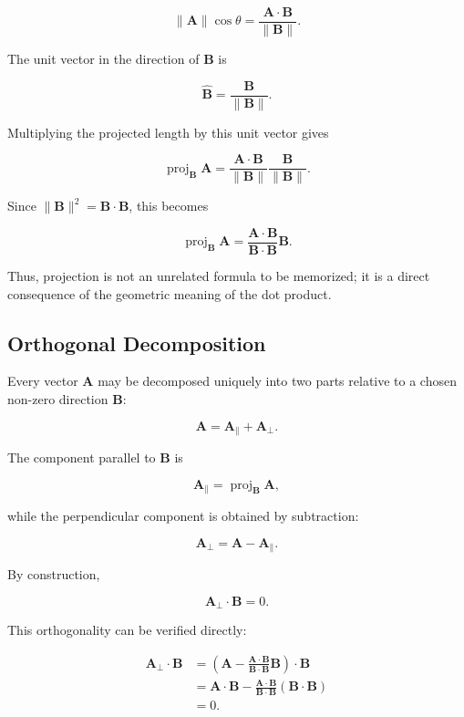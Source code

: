 \[
\lVert\mathbf A\rVert\cos\theta
=
\frac{\mathbf A\cdot\mathbf B}{\lVert\mathbf B\rVert}.
\]

The unit vector in the direction of $\mathbf B$ is

\[
\widehat{\mathbf B}
=
\frac{\mathbf B}{\lVert\mathbf B\rVert}.
\]

Multiplying the projected length by this unit vector gives

\[
\operatorname{proj}_{\mathbf B}\mathbf A
=
\frac{\mathbf A\cdot\mathbf B}{\lVert\mathbf B\rVert}
\frac{\mathbf B}{\lVert\mathbf B\rVert}.
\]

Since $\lVert\mathbf B\rVert^2=\mathbf B\cdot\mathbf B$, this becomes

\[
\boxed{
\operatorname{proj}_{\mathbf B}\mathbf A
=
\frac{\mathbf A\cdot\mathbf B}{\mathbf B\cdot\mathbf B}\mathbf B.
}
\]

Thus, projection is not an unrelated formula to be memorized; it is a direct
consequence of the geometric meaning of the dot product.

\subsection{Orthogonal Decomposition}

Every vector $\mathbf A$ may be decomposed uniquely into two parts relative to
a chosen non-zero direction $\mathbf B$:

\[
\boxed{
\mathbf A=\mathbf A_{\parallel}+\mathbf A_{\perp}.
}
\]

The component parallel to $\mathbf B$ is

\[
\boxed{
\mathbf A_{\parallel}
=
\operatorname{proj}_{\mathbf B}\mathbf A,
}
\]

while the perpendicular component is obtained by subtraction:

\[
\boxed{
\mathbf A_{\perp}
=
\mathbf A-\mathbf A_{\parallel}.
}
\]

By construction,

\[
\mathbf A_{\perp}\cdot\mathbf B=0.
\]

This orthogonality can be verified directly:

\[
\begin{aligned}
\mathbf A_{\perp}\cdot\mathbf B
&=
\left(
\mathbf A
-
\frac{\mathbf A\cdot\mathbf B}{\mathbf B\cdot\mathbf B}\mathbf B
\right)\cdot\mathbf B
\\
&=
\mathbf A\cdot\mathbf B
-
\frac{\mathbf A\cdot\mathbf B}{\mathbf B\cdot\mathbf B}
(\mathbf B\cdot\mathbf B)
\\
&=0.
\end{aligned}
\]

